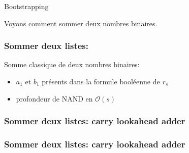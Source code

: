 \documentclass[10pt,xcolor={usenames,dvipsnames}]{beamer}
\begin{document}
\begin{section}{Bootstrapping}
\begin{frame}
Voyons comment sommer deux nombres binaires.

\end{frame} 


\begin{frame} 
\frametitle{Sommer deux listes: }
Somme classique de deux nombres binaires:
  \begin{figure}
    \begin{center}
      \begin{tikzpicture}[scale = 1.2, transform shape]
      	
      \end{tikzpicture}
    \end{center}
  \end{figure}
\begin{itemize}
\item $a_1$ et $b_1$ présents dans la formule booléenne de $r_s$
\item profondeur de NAND en $\mathcal{O}(s)$
\end{itemize}
\end{frame} 
    

\begin{frame} 
\frametitle{Sommer deux listes: carry lookahead adder}
  \begin{figure}
    \begin{center}
      \begin{tikzpicture}[scale = 1, transform shape]
      	
      \end{tikzpicture}
    \end{center}
  \end{figure}
\end{frame} 


\begin{frame} 
\frametitle{Sommer deux listes: carry lookahead adder}
  \begin{figure}
    \begin{center}
      \begin{tikzpicture}[scale = 0.5, transform shape]
      	
      \end{tikzpicture}
    \end{center}
  \end{figure}


\end{frame}
\end{section}
\end{document}
